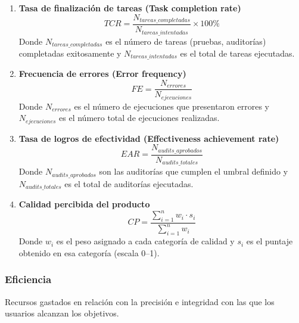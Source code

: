 \begin{enumerate}
    \item \textbf{Tasa de finalización de tareas (Task completion rate)}
          \[
              TCR = \frac{N_{tareas\_completadas}}{N_{tareas\_intentadas}} \times 100\%
          \]
          Donde \(N_{tareas\_completadas}\) es el número de tareas (pruebas, auditorías) completadas exitosamente y \(N_{tareas\_intentadas}\) es el total de tareas ejecutadas.

    \item \textbf{Frecuencia de errores (Error frequency)}
          \[
              FE = \frac{N_{errores}}{N_{ejecuciones}}
          \]
          Donde \(N_{errores}\) es el número de ejecuciones que presentaron errores y \(N_{ejecuciones}\) es el número total de ejecuciones realizadas.

    \item \textbf{Tasa de logros de efectividad (Effectiveness achievement rate)}
          \[
              EAR = \frac{N_{audits\_aprobados}}{N_{audits\_totales}}
          \]
          Donde \(N_{audits\_aprobados}\) son las auditorías que cumplen el umbral definido y \(N_{audits\_totales}\) es el total de auditorías ejecutadas.

    \item \textbf{Calidad percibida del producto}
          \[
              CP = \frac{\sum_{i=1}^{n} w_i \cdot s_i}{\sum_{i=1}^{n} w_i}
          \]
          Donde \(w_i\) es el peso asignado a cada categoría de calidad y \(s_i\) es el puntaje obtenido en esa categoría (escala 0--1).
\end{enumerate}

\subsubsection{Eficiencia}

Recursos gastados en relación con la precisión e integridad con las que los usuarios alcanzan los objetivos.

